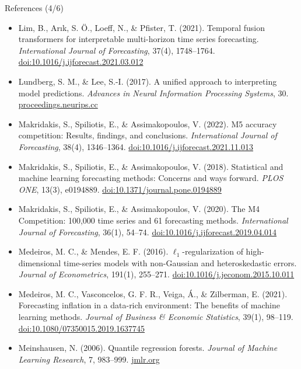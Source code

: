 \begin{frame}{References (4/6)}
\itemsize{\tiny}
\begin{itemize}
    \item Lim, B., Arık, S. Ö., Loeff, N., \& Pfister, T. (2021). Temporal fusion transformers for interpretable multi-horizon time series forecasting. \textit{International Journal of Forecasting}, 37(4), 1748--1764. \href{https://doi.org/10.1016/j.ijforecast.2021.03.012}{doi:10.1016/j.ijforecast.2021.03.012}
    \item Lundberg, S. M., \& Lee, S.-I. (2017). A unified approach to interpreting model predictions. \textit{Advances in Neural Information Processing Systems}, 30. \href{https://proceedings.neurips.cc/paper/2017/hash/8a20a8621978632d76c43dfd28b67767-Abstract.html}{proceedings.neurips.cc}
    \item Makridakis, S., Spiliotis, E., \& Assimakopoulos, V. (2022). M5 accuracy competition: Results, findings, and conclusions. \textit{International Journal of Forecasting}, 38(4), 1346--1364. \href{https://doi.org/10.1016/j.ijforecast.2021.11.013}{doi:10.1016/j.ijforecast.2021.11.013}
    \item Makridakis, S., Spiliotis, E., \& Assimakopoulos, V. (2018). Statistical and machine learning forecasting methods: Concerns and ways forward. \textit{PLOS ONE}, 13(3), e0194889. \href{https://doi.org/10.1371/journal.pone.0194889}{doi:10.1371/journal.pone.0194889}
    \item Makridakis, S., Spiliotis, E., \& Assimakopoulos, V. (2020). The M4 Competition: 100,000 time series and 61 forecasting methods. \textit{International Journal of Forecasting}, 36(1), 54--74. \href{https://doi.org/10.1016/j.ijforecast.2019.04.014}{doi:10.1016/j.ijforecast.2019.04.014}
    \item Medeiros, M. C., \& Mendes, E. F. (2016). $\ell_1$-regularization of high-dimensional time-series models with non-Gaussian and heteroskedastic errors. \textit{Journal of Econometrics}, 191(1), 255--271. \href{https://doi.org/10.1016/j.jeconom.2015.10.011}{doi:10.1016/j.jeconom.2015.10.011}
    \item Medeiros, M. C., Vasconcelos, G. F. R., Veiga, Á., \& Zilberman, E. (2021). Forecasting inflation in a data-rich environment: The benefits of machine learning methods. \textit{Journal of Business \& Economic Statistics}, 39(1), 98--119. \href{https://doi.org/10.1080/07350015.2019.1637745}{doi:10.1080/07350015.2019.1637745}
    \item Meinshausen, N. (2006). Quantile regression forests. \textit{Journal of Machine Learning Research}, 7, 983--999. \href{https://jmlr.org/papers/v7/meinshausen06a.html}{jmlr.org}

\end{itemize}
\end{frame}
